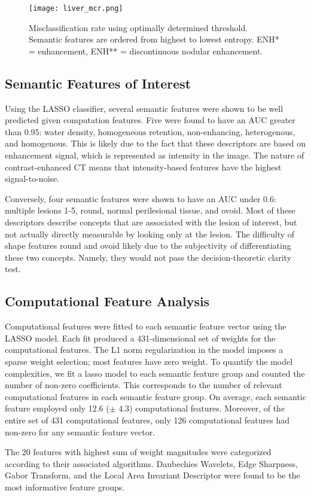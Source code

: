 \begin{figure}
	\centering
	\texttt{[image: liver\_mcr.png]}
	\caption[MCR results for liver annotation]{Misclassification rate using optimally determined threshold. Semantic features are ordered from highest to lowest entropy. ENH* = enhancement, ENH** = discontinuous nodular enhancement.}
	\label{fig:liver_mcr}
\end{figure}


\clearpage


\subsection{Semantic Features of Interest}
Using the LASSO classifier, several semantic features were shown to be well predicted given computation features.
Five were found to have an AUC greater than 0.95: water density, homogeneous retention, non-enhancing, heterogenous, and homogenous.
This is likely due to the fact that these descriptors are based on enhancement signal, which is represented as intensity in the image.
The nature of contrast-enhanced CT means that intensity-based features have the highest signal-to-noise.

Conversely, four semantic features were shown to have an AUC under 0.6: multiple lesions 1-5, round, normal perilesional tissue, and ovoid.
Most of these descriptors describe concepts that are associated with the lesion of interest, but not actually directly measurable by looking only at the lesion.
The difficulty of shape features round and ovoid likely due to the subjectivity of differentiating these two concepts.
Namely, they would not pass the decision-theoretic clarity test.

\subsection{Computational Feature Analysis}
Computational features were fitted to each semantic feature vector using the LASSO model.
Each fit produced a 431-dimensional set of weights for the computational features.
The L1 norm regularization in the model imposes a sparse weight selection; most features have zero weight.
To quantify the model complexities, we fit a lasso model to each semantic feature group and counted the number of non-zero coefficients.
This corresponds to the number of relevant computational features in each semantic feature group.
On average, each semantic feature employed only 12.6 ($\pm$ 4.3) computational features.
Moreover, of the entire set of 431 computational features, only 126 computational features had non-zero for any semantic feature vector.

The 20 features with highest sum of weight magnitudes were categorized according to their associated algorithms.
Daubechies Wavelets, Edge Sharpness, Gabor Transform, and the Local Area Invariant Descriptor were found to be the most informative feature groups.
